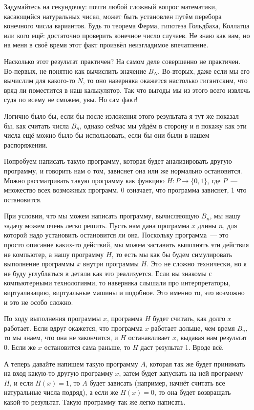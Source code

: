 Задумайтесь на секундочку: почти любой сложный вопрос математики, касающийся натуральных чисел, может быть установлен путём перебора конечного числа вариантов. Будь то теорема Ферма, гипотеза Гольдбаха, Коллатца или кого ещё: достаточно проверить конечное число случаев. Не знаю как вам, но на меня в своё время этот факт произвёл неизгладимое впечатление.

Насколько этот результат практичен? На самом деле совершенно не практичен. Во-первых, не понятно как вычислить значение $B_N$. Во-вторых, даже если мы его вычислим для какого-то $N$, то оно наверняка окажется настолько гигантским, что вряд ли поместится в наш калькулятор. Так что выгоды мы из этого всего извлечь судя по всему не сможем, увы. Но сам факт!

Логично было бы, если бы после изложения этого результата я тут же показал бы, как считать числа $B_n$, однако сейчас мы уйдём в сторону и я покажу как эти числа ещё можно было бы использовать, если бы они были в нашем распоряжении.

Попробуем написать такую программу, которая будет анализировать другую программу, и говорить нам о том, зависнет она или же нормально остановится. Можно рассматривать такую программу как функцию $H:P\to\{0,1\}$, где $P$~— множество всех возможных программ. 0 означает, что программа зависнет, 1 что остановится.

При условии, что мы можем написать программу, вычисляющую $B_n$, мы нашу задачу можем очень легко решить. Пусть нам дана программа $x$ длины $n$, для которой надо установить остановится ли она. Поскольку программа~— это просто описание каких-то действий, мы можем заставить выполнять эти действия не компьютер, а нашу программу $H$, то есть мы как бы будем симулировать выполнение программы $x$ внутри программы $H$. Это не сложно технически, но я не буду углубляться в детали как это реализуется. Если вы знакомы с компьютерными технологиями, то наверняка слышали про интерпретаторы, виртуализацию, виртуальные машины и подобное. Это именно то, это возможно и это не особо сложно.

По ходу выполнения программы $x$, программа $H$ будет считать, как долго $x$ работает. Если вдруг окажется, что программа $x$ работает дольше, чем время $B_n$, то мы знаем, что она не закончится, и $H$ останавливает $x$, выдавая нам результат 0. Если же $x$ остановится сама раньше, то $H$ даст результат 1. Вроде всё.

А теперь давайте напишем такую программу $A$, которая так же будет принимать на вход какую-то другую программу $x$, затем будет запускать на ней программу $H$, и если $H(x)=1$, то $A$ будет зависать (например, начнёт считать все натуральные числа подряд), а если же $H(x)=0$, то она будет возвращать какой-то результат. Такую программу так же легко написать.

